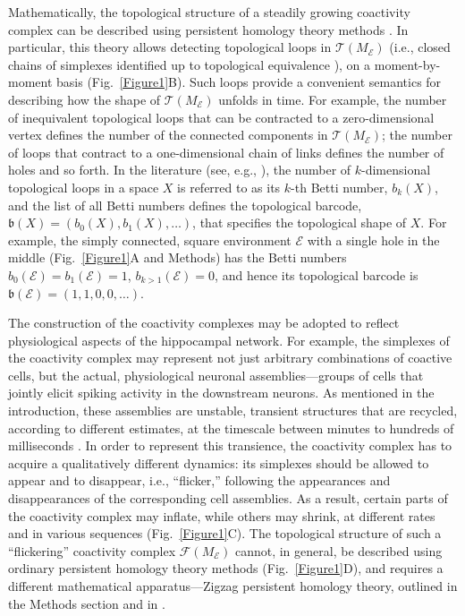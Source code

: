 \documentclass[12pt,tightenlines]{revtex4}
\begin{document}
Mathematically, the topological structure of a steadily growing coactivity complex can be described using persistent 
homology theory methods \cite{Ghrist,Zomorodian}. In particular, this theory allows detecting topological loops in 
$\mathcal{T}(M_\mathcal{E})$ (i.e., closed chains of simplexes identified up to topological equivalence \cite{Friedman}), 
on a moment-by-moment basis (Fig.~\ref{Figure1}B). Such loops provide a convenient semantics for describing how the shape 
of $\mathcal{T}(M_\mathcal{E})$ unfolds in time. For example, the number of inequivalent topological loops that can be 
contracted to a zero-dimensional vertex defines the number of the connected components in $\mathcal{T}(M_\mathcal{E})$; 
the number of loops that contract to a one-dimensional chain of links defines the number of holes and so forth.  
In the literature (see, e.g., \cite{Hatcher}), the number of $k$-dimensional topological loops in a space $X$ is referred to as its 
$k$-th Betti number, $b_k(X)$, and the list of all Betti numbers defines the topological barcode, 
$\mathfrak{b}(X) = (b_0(X),b_1(X),\ldots)$, that specifies the topological shape of $X$. For example, the 
simply connected, square environment $\mathcal{E}$ with a single hole in the middle (Fig.~\ref{Figure1}A and Methods) has 
the Betti numbers $b_0(\mathcal{E}) = b_1(\mathcal{E}) = 1$, $b_{k >1}(\mathcal{E}) = 0$, and hence its topological 
barcode is $\mathfrak{b}(\mathcal{E}) = (1,1,0,0,\ldots)$.

The construction of the coactivity complexes may be adopted to reflect physiological aspects of the hippocampal network. 
For example, the simplexes of the coactivity complex may represent not just arbitrary combinations of coactive cells, but 
the actual, physiological neuronal assemblies---groups of cells that jointly elicit spiking activity in the downstream neurons. 
As mentioned in the introduction, these assemblies are unstable, transient structures that are recycled, according to 
different estimates, at the timescale between minutes to hundreds of milliseconds \cite{Harris, Buzsaki1}. In order to 
represent this transience, the coactivity complex has to acquire a qualitatively different dynamics: its simplexes should 
be allowed to appear and to disappear, i.e., ``flicker,'' following the appearances and disappearances of the corresponding 
cell assemblies. As a result, certain parts of the coactivity complex may inflate, while others may shrink, at different rates 
and in various sequences (Fig.~\ref{Figure1}C). The topological structure of such a ``flickering'' coactivity complex
 $\mathcal{F}(M_\mathcal{E})$ cannot, in general, be described using ordinary persistent homology theory methods 
 (Fig.~\ref{Figure1}D), and requires a different mathematical apparatus---Zigzag persistent homology theory, outlined in the 
 Methods section and in \cite{Carlsson1,Carlsson2, Edelsbrunner}.
\end{document}
